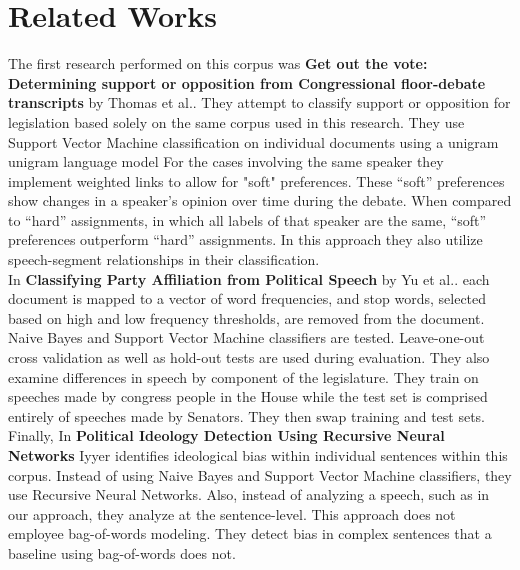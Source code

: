 \documentclass[a4paper, 12pt]{article}
\begin{document}
\section{Related Works}
\label{gen_inst}
The first research performed on this corpus was \cite{thomas2006get} \textbf{Get out the vote: Determining support or opposition from Congressional floor-debate transcripts} by Thomas et al.. They attempt to classify support or opposition for legislation based solely on the same corpus used in this research. They use Support Vector Machine classification on individual documents using a unigram unigram language model For the cases involving the same speaker they implement weighted links to allow for "soft" preferences. These ``soft'' preferences show changes in a speaker's opinion over time during the debate. When compared to ``hard'' assignments, in which all labels of that speaker are the same,  ``soft'' preferences outperform ``hard'' assignments. In this approach they also utilize speech-segment relationships in their classification. \\

\noindent	
In \cite{yu2008classifying} \textbf{Classifying Party Affiliation from Political Speech} by Yu et al.. each document is mapped to a vector of word frequencies, and stop words, selected based on high and low frequency thresholds, are removed from the document. Naive Bayes and Support Vector Machine classifiers are tested. Leave-one-out cross validation as well as hold-out tests are used during evaluation. They also examine differences in speech by component of the legislature. They train on speeches made by congress people in the House while the test set is comprised entirely of speeches made by Senators.  They then swap training and test sets. 
\noindent
Finally, In  \cite{iyyer2014political} \textbf{Political Ideology Detection Using Recursive Neural Networks} Iyyer identifies ideological bias within individual sentences within this corpus. Instead of using Naive Bayes and Support Vector Machine classifiers, they use Recursive Neural Networks. Also, instead of analyzing a speech, such as in our approach, they analyze at the sentence-level. This approach does not employee bag-of-words modeling. They detect bias in complex sentences that a baseline using bag-of-words does not. 
	

	
\end{document}
